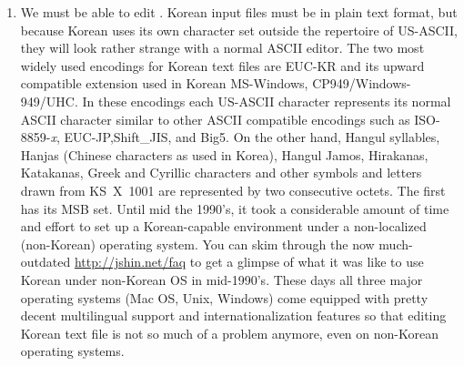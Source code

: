 \documentclass[twoside,letterpaper,11pt]{article}
\begin{document}
\begin{enumerate}
\item 
We must be able to 
edit .
Korean input files must be in plain text format, but because Korean
uses its own character set outside the
repertoire of US-ASCII, they will look rather strange with a normal ASCII editor.  The two most widely used encodings for
Korean text files are  EUC-KR and its upward compatible
extension used in Korean MS-Windows, CP949/Windows-949/UHC.
In these encodings each US-ASCII character represents its normal ASCII
character similar to other ASCII compatible encodings such as
ISO-8859-\textit{x}, EUC-JP,Shift\_JIS, and Big5. On the other hand, Hangul
syllables, Hanjas (Chinese characters as used in Korea), Hangul Jamos,
Hirakanas, Katakanas, Greek and Cyrillic characters and other
symbols and letters drawn from KS~X~1001 are represented by two
consecutive octets. The first has its MSB set.
Until mid the 1990's, it took a considerable amount of time and effort to
set up a Korean-capable environment under a non-localized (non-Korean)
operating system. 
You can skim through the now much-outdated \url{http://jshin.net/faq} to get 
a glimpse of what it was like to use Korean under non-Korean OS in mid-1990's.
These days all three major operating systems (Mac OS, Unix, Windows) come equipped
with pretty decent multilingual support and internationalization features
so that editing Korean text file is not so much of a problem anymore, even
on non-Korean operating systems.


\end{enumerate}
\end{document}
